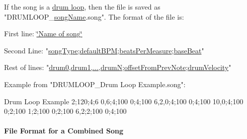 If the song is a \hyperlink{group___song_group_DocSongDrumLoop}{drum loop}, then the file is saved as "D\+R\+U\+M\+L\+O\+O\+P\+\_\+\hyperlink{group___song_priv_var_ga6a5e6c1e4aa92939e2b5c1e3d9908df8}{song\+Name}.song". The format of the file is\+: \begin{DoxyItemize}
\item First line\+: \hyperlink{group___song_priv_var_ga6a5e6c1e4aa92939e2b5c1e3d9908df8}{\char`\"{}\+Name of song\char`\"{}} \item Second Line\+: "\hyperlink{group___song_enums_gae681a1f001333e39fc1cb4fea97bfe1b}{song\+Type};\hyperlink{group___audio_DefBPM}{default\+B\+PM};\hyperlink{group___music_structs_acda79d249e7a1974a152832a881e9f0b}{beats\+Per\+Measure};\hyperlink{group___music_structs_aaf5b010a2541959c26f96630db042ee8}{base\+Beat}" \item Rest of lines\+: "\hyperlink{group___music_structs_a11ba5b49d8ee25941337573029660f25}{drum0,drum1,...,drumN};\hyperlink{group___music_structs_ae281187907aed4c728c7981300dbebaf}{offset\+From\+Prev\+Note};\hyperlink{group___music_structs_a98181a53f924736c2df08f886cffed7d}{drum\+Velocity}" \item Example from "D\+R\+U\+M\+L\+O\+O\+P\+\_\+\+Drum Loop Example.\+song"\+: \begin{DoxyVerb}Drum Loop Example
2;120;4;6
0,6;4;100
0;4;100
6,2,0;4;100
0;4;100
10,0;4;100
0;2;100
1;2;100
0;2;100
6,2;2;100
0;4;100
\end{DoxyVerb}
\end{DoxyItemize}
\hypertarget{group___song_group_DocSongFileFormatCombined}{}\paragraph{File Format for a Combined Song}\label{group___song_group_DocSongFileFormatCombined}
